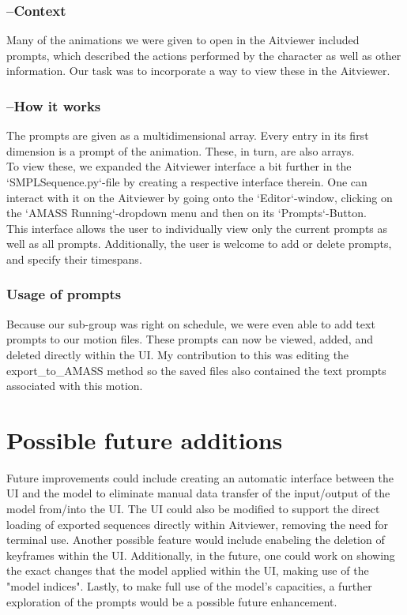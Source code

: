 \documentclass[a4paper]{scrartcl}
\begin{document}
\subsubsection*{--Context}
Many of the animations we were given to open in the Aitviewer included prompts, which described the actions performed by the character as well as other information. Our task was to incorporate a way to view these in the Aitviewer.

\subsubsection*{--How it works}
The prompts are given as a multidimensional array. Every entry in its first dimension is a prompt of the animation. These, in turn, are also arrays.\\
To view these, we expanded the Aitviewer interface a bit further in the `SMPLSequence.py`-file by creating a respective interface therein. One can interact with it on the Aitviewer by going onto the `Editor`-window, clicking on the `AMASS Running`-dropdown menu and then on its `Prompts`-Button.\\
This interface allows the user to individually view only the current prompts as well as all prompts. Additionally, the user is welcome to add or delete prompts, and specify their timespans.

\subsubsection*{Usage of prompts}
Because our sub-group was right on schedule, we were even able to add text prompts to our motion files. These prompts can now be viewed, added, and deleted directly within the UI. My contribution to this was editing the export\_to\_AMASS method so the saved files also contained the text prompts associated with this motion.


\section*{Possible future additions}
Future improvements could include creating an automatic interface between the UI and the model to eliminate manual data transfer of the input/output of the model from/into the UI. The UI could also be modified to support the direct loading of exported sequences directly within Aitviewer, removing the need for terminal use. Another possible feature would include enabeling the deletion of keyframes within the UI. Additionally, in the future, one could work on showing the exact changes that the model applied within the UI, making use of the "model indices". Lastly, to make full use of the model's capacities, a further exploration of the prompts would be a possible future enhancement.
\end{document}
